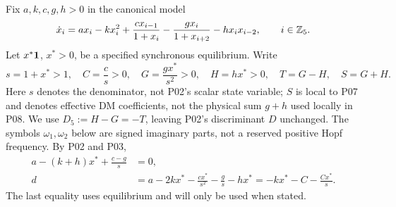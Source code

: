 Fix $a,k,c,g,h>0$ in the canonical model
\begin{equation}
 \dot x_i=ax_i-kx_i^2+\frac{cx_{i-1}}{1+x_i}
       -\frac{gx_i}{1+x_{i+2}}-hx_ix_{i-2},\qquad i\in\mathbb{Z}_5.
 \label{eq:P07-model}
\end{equation}
Let $x^*\mathbf{1}$, $x^*>0$, be a specified synchronous equilibrium. Write
\begin{equation}
 s=1+x^*>1,\quad C=\frac cs>0,\quad G=\frac{gx^*}{s^2}>0,
 \quad H=hx^*>0,\quad T=G-H,\quad S=G+H.
 \label{eq:P07-coefficients}
\end{equation}
Here $s$ denotes the denominator, not P02's scalar state variable;
$S$ is local to P07 and denotes effective DM coefficients, not the
physical sum $g+h$ used locally in P08. We use $D_5:=H-G=-T$,
leaving P02's discriminant $D$ unchanged. The symbols $\omega_1,\omega_2$
below are signed imaginary parts, not a reserved positive Hopf frequency.
By P02 and P03,
\begin{align}
 a-(k+h)x^*+\frac{c-g}{s}&=0,\label{eq:P07-equilibrium}\\
 d&=a-2kx^*-\frac{cx^*}{s^2}-\frac gs-hx^*
   =-kx^*-C-\frac{Cx^*}{s}.\label{eq:P07-d}
\end{align}
The last equality uses equilibrium and will only be used when stated.


